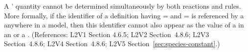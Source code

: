 A \Species' quantity cannot be determined simultaneously by both
reactions and rules.  More formally, if the identifier of a
\Species definition having =
and = is referenced by a
\SpeciesReference anywhere in a model, then this identifier cannot
also appear as the value of a  in an
\AssignmentRule or a \RateRule.  (References: L2V1 Section 4.6.5;
L2V2 Section~4.8.6; L2V3 Section~4.8.6; L2V4 Section~4.8.6; L2V5 Section~\ref{sec:species-constant}.)
